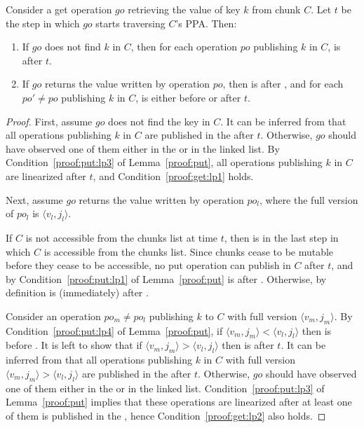 \begin{lemma}
\label{proof:get}
Consider a get operation $go$ retrieving the value of key $k$ from chunk $C$. Let $t$ be the step in which $go$ starts traversing $C$'s {PPA}. Then:
\begin{enumerate}
\setlength{\itemsep}{0pt}
\setlength{\parskip}{0pt}
\item \label{proof:get:lp1} If $go$ does not find $k$ in $C$, then for each operation $po$ publishing $k$ in $C$,  is after $t$.
\item \label{proof:get:lp2} If $go$ returns the value written by operation $po$, then  is after , and for each  $po' \neq po$ publishing $k$ in $C$,  is either before  or after $t$.
\end{enumerate}
\end{lemma}
\begin{proof}

First, assume $go$ does not find the key in $C$. It can be inferred from  that all operations publishing $k$ in $C$ are published in the  after $t$. Otherwise, $go$ should have observed one of them either in the  or in the linked list. By Condition~\ref{proof:put:lp3} of Lemma~\ref{proof:put}, all operations publishing $k$ in $C$ are linearized after $t$, and Condition~\ref{proof:get:lp1} holds.

Next, assume $go$ returns the value written by operation $po_l$, where the full version of $po_l$ is $\langle v_l, j_l\rangle$. 

If $C$ is not accessible from the chunks list at time $t$, then  is in the last step in which $C$ is accessible from the chunks list. Since  chunks cease to be mutable before they cease to be accessible, no put operation can publish in $C$ after $t$, and by Condition~\ref{proof:put:lp1} of Lemma~\ref{proof:put}   is after . Otherwise, by definition   is (immediately) after  .

Consider an operation $po_m \neq po_l$ publishing $k$ to $C$ with full version $\langle v_m, j_m\rangle$.
By Condition~\ref{proof:put:lp4} of Lemma~\ref{proof:put}, if $\langle v_m, j_m\rangle < \langle v_l, j_l\rangle$ then  is before . It is left to show that if $\langle v_m, j_m\rangle > \langle v_l, j_l\rangle$ then  is after $t$.
It can be inferred from  that all operations publishing $k$ in $C$ with full version $\langle v_m, j_m\rangle > \langle v_l, j_l\rangle$ are published in the  after $t$. Otherwise, $go$ should have observed one of them either in the  or in the linked list.
Condition~\ref{proof:put:lp3} of Lemma~\ref{proof:put} implies that these operations are linearized after at least one of them is published in the , hence Condition~\ref{proof:get:lp2} also holds.
\end{proof}

